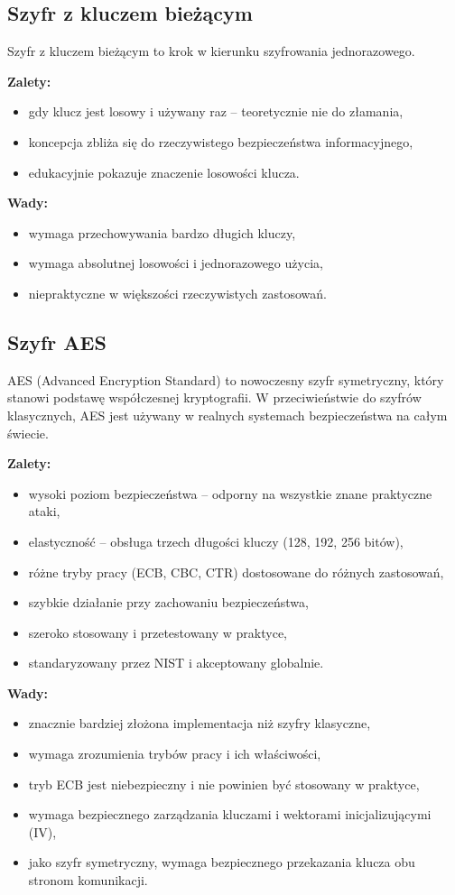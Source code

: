 \documentclass[12pt,a4paper]{article}
\begin{document}
\newpage
\subsection{Szyfr z kluczem bieżącym}
Szyfr z kluczem bieżącym to krok w kierunku szyfrowania jednorazowego.

\textbf{Zalety:}
\begin{itemize}
    \item gdy klucz jest losowy i używany raz -- teoretycznie nie do złamania,
    \item koncepcja zbliża się do rzeczywistego bezpieczeństwa informacyjnego,
    \item edukacyjnie pokazuje znaczenie losowości klucza.
\end{itemize}

\textbf{Wady:}
\begin{itemize}
    \item wymaga przechowywania bardzo długich kluczy,
    \item wymaga absolutnej losowości i jednorazowego użycia,
    \item niepraktyczne w większości rzeczywistych zastosowań.
\end{itemize}

\subsection{Szyfr AES}
AES (Advanced Encryption Standard) to nowoczesny szyfr symetryczny, który stanowi podstawę współczesnej kryptografii. 
W przeciwieństwie do szyfrów klasycznych, AES jest używany w realnych systemach bezpieczeństwa na całym świecie.

\textbf{Zalety:}
\begin{itemize}
    \item wysoki poziom bezpieczeństwa -- odporny na wszystkie znane praktyczne ataki,
    \item elastyczność -- obsługa trzech długości kluczy (128, 192, 256 bitów),
    \item różne tryby pracy (ECB, CBC, CTR) dostosowane do różnych zastosowań,
    \item szybkie działanie przy zachowaniu bezpieczeństwa,
    \item szeroko stosowany i przetestowany w praktyce,
    \item standaryzowany przez NIST i akceptowany globalnie.
\end{itemize}

\textbf{Wady:}
\begin{itemize}
    \item znacznie bardziej złożona implementacja niż szyfry klasyczne,
    \item wymaga zrozumienia trybów pracy i ich właściwości,
    \item tryb ECB jest niebezpieczny i nie powinien być stosowany w praktyce,
    \item wymaga bezpiecznego zarządzania kluczami i wektorami inicjalizującymi (IV),
    \item jako szyfr symetryczny, wymaga bezpiecznego przekazania klucza obu stronom komunikacji.
\end{itemize}
\end{document}
